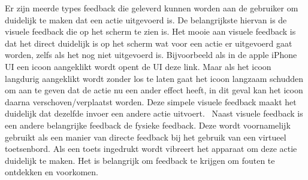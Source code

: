 Er zijn meerde types feedback die geleverd kunnen worden aan de gebruiker om duidelijk te maken dat een actie uitgevoerd is. De belangrijkste hiervan is de visuele feedback die op het scherm te zien is. Het mooie aan visuele feedback is dat het direct duidelijk is op het scherm wat voor een actie er uitgevoerd gaat worden, zelfs als het nog niet uitgevoerd is. Bijvoorbeeld als in de apple iPhone UI een icoon aangeklikt wordt opent de UI deze link. Maar als het icoon langdurig aangeklikt wordt zonder los te laten gaat het icoon langzaam schudden om aan te geven dat de actie nu een ander effect heeft, in dit geval kan het icoon daarna verschoven/verplaatst worden. Deze simpele visuele feedback maakt het duidelijk dat dezelfde invoer een andere actie uitvoert.  Naast visuele feedback is een andere belangrijke feedback de fysieke feedback. Deze wordt voornamelijk gebruikt als een manier van directe feedback bij het gebruik van een virtueel toetsenbord. Als een toets ingedrukt wordt vibreert het apparaat om deze actie duidelijk te maken. Het is belangrijk om feedback te krijgen om fouten te ontdekken en voorkomen.


